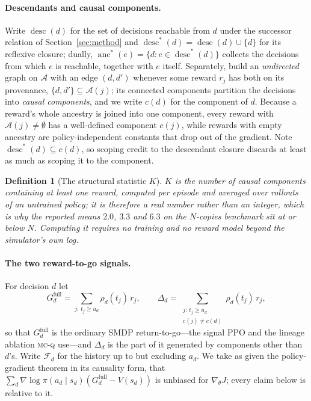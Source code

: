 \documentclass[review,authoryear,3p,times]{elsarticle}
\newtheorem{definition}{Definition}
\newcommand{\mcq}{\textsc{mc-q}}
\newcommand{\Fscr}{\mathcal{F}}
\newcommand{\Ascr}{\mathcal{A}}
\newcommand{\desc}{\operatorname{desc}}
\newcommand{\anc}{\operatorname{anc}}
\begin{document}
\paragraph{Descendants and causal components.}
Write $\desc(d)$ for the set of decisions reachable from $d$ under the successor
relation of Section~\ref{sec:method} and $\desc^{*}(d)=\desc(d)\cup\{d\}$ for
its reflexive closure; dually, $\anc^{*}(e)=\{d:e\in\desc^{*}(d)\}$ collects the
decisions from which $e$ is reachable, together with $e$ itself. Separately,
build an \emph{undirected} graph on $\Ascr$
with an edge $(d,d')$ whenever some reward $r_j$ has both on its provenance,
$\{d,d'\}\subseteq\Ascr(j)$; its connected components partition the decisions
into \emph{causal components}, and we write $c(d)$ for the component of $d$.
Because a reward's whole ancestry is joined into one component, every reward
with $\Ascr(j)\neq\emptyset$ has a well-defined component $c(j)$, while rewards
with empty ancestry are policy-independent constants that drop out of the
gradient. Note $\desc^{*}(d)\subseteq c(d)$, so scoping credit to the descendant
closure discards at least as much as scoping it to the component.

\begin{definition}[The structural statistic $K$]
\label{def:k}
$K$ is the number of causal components containing at least one reward, computed
per episode and averaged over rollouts of an untrained policy; it is therefore a
real number rather than an integer, which is why the reported means $2.0$, $3.3$
and $6.3$ on the $N$-copies benchmark sit at or below $N$. Computing it requires
no training and no reward model beyond the simulator's own log.
\end{definition}

\paragraph{The two reward-to-go signals.} For decision $d$ let
\[
  G_d^{\mathrm{full}}=\sum_{j:\,t_j\ge u_d}\rho_d(t_j)\,r_j,
  \qquad
  \Delta_d=\sum_{\substack{j:\,t_j\ge u_d\\ c(j)\neq c(d)}}\rho_d(t_j)\,r_j ,
\]
so that $G_d^{\mathrm{full}}$ is the ordinary SMDP return-to-go---the signal PPO
and the lineage ablation \mcq{} use---and $\Delta_d$ is the part of it generated
by components other than $d$'s. Write $\Fscr_d$ for the history up to but
excluding $a_d$. We take as given the policy-gradient theorem in its causality
form, that $\sum_d \nabla\log\pi(a_d\mid s_d)(G_d^{\mathrm{full}}-V(s_d))$ is
unbiased for $\nabla_\theta J$; every claim below is relative to it.
\end{document}
